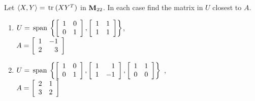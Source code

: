 \begin{multicols}{2}
\begin{ex}
\begin{sol}
\begin{enumerate}[label={\alph*.}]
\end{enumerate}
\end{sol}
\end{ex}

\begin{ex}
Let $\langle X, Y\rangle = \thinspace\operatorname{tr\medspace}(XY^{T})$ in $\textbf{M}_{22}$. In each case find the matrix in $U$ closest to $A$.

\begin{enumerate}[label={\alph*.}]
\item 
$U = \thinspace\operatorname{span\medspace}
\left\{
\left[ \begin{array}{rr}
1 & 0 \\
0 & 1
\end{array} \right]
,
\left[ \begin{array}{rr}
1 & 1 \\
1 & 1
\end{array} \right]
\right\}$, \\ $A = \left[ \begin{array}{rr}
1 & -1 \\
2 & 3
\end{array} \right]$

\item 
$U =  \thinspace\operatorname{span\medspace}
\left\{
\left[ \begin{array}{rr}
1 & 0 \\
0 & 1
\end{array} \right]
,
\left[ \begin{array}{rr}
1 & 1 \\
1 & -1
\end{array} \right]
,
\left[ \begin{array}{rr}
1 & 1 \\
0 & 0
\end{array} \right]
\right\}$
, \\ $A = 
\left[ \begin{array}{rr}
2 & 1 \\
3 & 2
\end{array} \right]$


\end{enumerate}
\end{ex}
\end{multicols}
